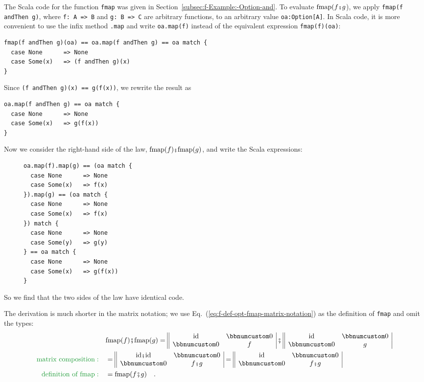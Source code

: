 The Scala code for the function \lstinline!fmap! was given in Section~\ref{subsec:f-Example:-Option-and}.
To evaluate $\text{fmap}(f\bef g$), we apply \lstinline!fmap(f andThen g)!,
where \lstinline!f: A => B! and \lstinline!g: B => C! are arbitrary
functions, to an arbitrary value \lstinline!oa:Option[A]!. In Scala
code, it is more convenient to use the infix method \lstinline!.map!
and write \lstinline!oa.map(f)! instead of the equivalent expression
\lstinline!fmap(f)(oa)!:
\begin{lstlisting}
fmap(f andThen g)(oa) == oa.map(f andThen g) == oa match {
  case None      => None
  case Some(x)   => (f andThen g)(x)
}
\end{lstlisting}
Since \lstinline!(f andThen g)(x) == g(f(x))!, we rewrite the result
as
\begin{lstlisting}
oa.map(f andThen g) == oa match {
  case None      => None
  case Some(x)   => g(f(x))
}
\end{lstlisting}
Now we consider the right-hand side of the law, $\text{fmap}(f)\bef\text{fmap}(g)$,
and write the Scala expressions:

\begin{wrapfigure}{l}{0.33\columnwidth}%
\vspace{-0.8\baselineskip}
\begin{lstlisting}
oa.map(f).map(g) == (oa match {
  case None      => None
  case Some(x)   => f(x)
}).map(g) == (oa match {
  case None      => None
  case Some(x)   => f(x)
}) match {
  case None      => None
  case Some(y)   => g(y)
} == oa match {
  case None      => None
  case Some(x)   => g(f(x))
}
\end{lstlisting}
\vspace{-7\baselineskip}
\end{wrapfigure}%

\noindent So we find that the two sides of the law have identical
code.

The derivation is much shorter in the matrix notation; we use Eq.~(\ref{eq:f-def-opt-fmap-matrix-notation})
as the definition of \lstinline!fmap! and omit the types:
\begin{align*}
 & \text{fmap}(f)\bef\text{fmap}(g)=\begin{array}{||cc|}
\text{id} & \bbnum 0\\
\bbnum 0 & f
\end{array}\,\bef\,\begin{array}{||cc|}
\text{id} & \bbnum 0\\
\bbnum 0 & g
\end{array}\\
{\color{greenunder}\text{matrix composition}:}\quad & =\begin{array}{||cc|}
\text{id}\bef\text{id} & \bbnum 0\\
\bbnum 0 & f\bef g
\end{array}=\begin{array}{||cc|}
\text{id} & \bbnum 0\\
\bbnum 0 & f\bef g
\end{array}\\
{\color{greenunder}\text{definition of fmap}:}\quad & =\text{fmap}(f\bef g)\quad.
\end{align*}

